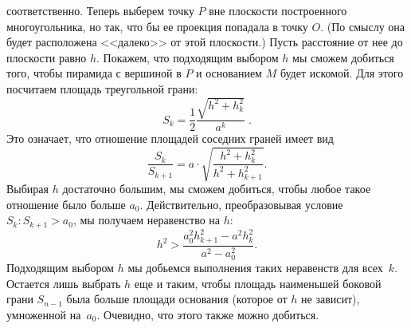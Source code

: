 соответственно.
Теперь выберем точку $P$ вне плоскости построенного многоугольника, но так, что
бы ее проекция попадала в точку $O$.
(По смыслу она будет расположена <<далеко>> от этой плоскости.)
Пусть расстояние от нее до плоскости равно $h$.
Покажем, что подходящим выбором $h$ мы сможем добиться того, чтобы пирамида с
вершиной в $P$ и основанием $M$ будет искомой.
Для этого посчитаем площадь треугольной грани:
\[
    S_k
=
    \frac{1}{2} \frac{\sqrt{h^2 + h_k^2}}{a^k}
\;.\]
Это означает, что отношение площадей соседних граней имеет вид 
\[
    \frac{S_k}{S_{k+1}}
=
    a \cdot \sqrt{\frac{h^2 + h_k^2}{h^2 + h_{k+1}^2}}.
\] 
Выбирая $h$ достаточно большим, мы сможем добиться, чтобы любое такое
отношение было больше $a_0$.
Действительно, преобразовывая условие $S_k : S_{k+1} > a_0$,
мы получаем неравенство на $h$:
\[
    h^2
>
    \frac{a_0^2h_{k+1}^2-a^2h_k^2}{a^2-a_0^2}
.\]
Подходящим выбором $h$ мы добьемся выполнения таких неравенств для всех~$k$.
Остается лишь выбрать $h$ еще и таким, чтобы площадь наименьшей боковой грани
$S_{n-1}$ была больше площади основания (которое от $h$ не зависит), умноженной
на~$a_0$.
Очевидно, что этого также можно добиться.
\endproblem

